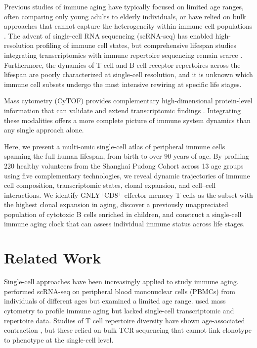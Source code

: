 \documentclass[11pt]{article}
\begin{document}
Previous studies of immune aging have typically focused on limited age ranges, often comparing only young adults to elderly individuals, or have relied on bulk approaches that cannot capture the heterogeneity within immune cell populations \citep{alpert2019multi}. The advent of single-cell RNA sequencing (scRNA-seq) has enabled high-resolution profiling of immune cell states, but comprehensive lifespan studies integrating transcriptomics with immune repertoire sequencing remain scarce \citep{zheng2020landscape}. Furthermore, the dynamics of T cell and B cell receptor repertoires across the lifespan are poorly characterized at single-cell resolution, and it is unknown which immune cell subsets undergo the most intensive rewiring at specific life stages.

Mass cytometry (CyTOF) provides complementary high-dimensional protein-level information that can validate and extend transcriptomic findings \citep{bendall2011single}. Integrating these modalities offers a more complete picture of immune system dynamics than any single approach alone.

Here, we present a multi-omic single-cell atlas of peripheral immune cells spanning the full human lifespan, from birth to over 90 years of age. By profiling 220 healthy volunteers from the Shanghai Pudong Cohort across 13 age groups using five complementary technologies, we reveal dynamic trajectories of immune cell composition, transcriptomic states, clonal expansion, and cell--cell interactions. We identify GNLY$^+$CD8$^+$ effector memory T cells as the subset with the highest clonal expansion in aging, discover a previously unappreciated population of cytotoxic B cells enriched in children, and construct a single-cell immune aging clock that can assess individual immune status across life stages.

\section{Related Work}

Single-cell approaches have been increasingly applied to study immune aging. \citet{zheng2020landscape} performed scRNA-seq on peripheral blood mononuclear cells (PBMCs) from individuals of different ages but examined a limited age range. \citet{alpert2019multi} used mass cytometry to profile immune aging but lacked single-cell transcriptomic and repertoire data. Studies of T cell repertoire diversity have shown age-associated contraction \citep{britanova2014age}, but these relied on bulk TCR sequencing that cannot link clonotype to phenotype at the single-cell level.
\end{document}
